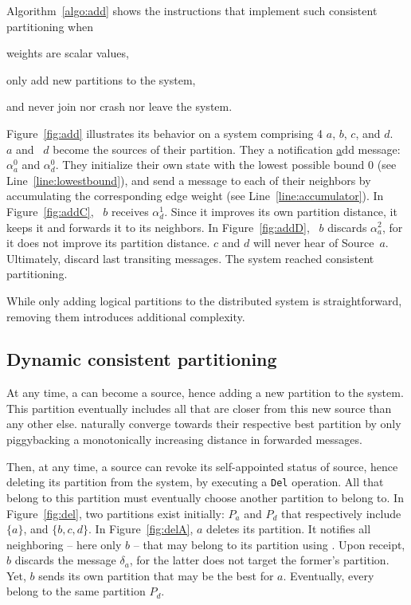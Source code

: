  

Algorithm~\ref{algo:add} shows the instructions that implement such
consistent partitioning when
\begin{inparaenum}[(i)]
\item weights are scalar values,
\item \processes only add new partitions to the system,
\item and \processes never join nor crash nor leave the system.
\end{inparaenum}
Figure~\ref{fig:add} illustrates its behavior on a system comprising 4
\processes $a$, $b$, $c$, and $d$. \Process~$a$ and \Process~$d$ become
the sources of their partition. They \NAMEB a notification
\underline{a}dd message: $\alpha_a^0$ and $\alpha_d^0$. They
initialize their own state with the lowest possible bound $0$ (see
Line~\ref{line:lowestbound}), and send a message to each of their
neighbors by accumulating the corresponding edge weight (see
Line~\ref{line:accumulator}). In Figure~\ref{fig:addC}, \Process~$b$
receives $\alpha_{d}^{1}$. Since it improves its own partition
distance, it keeps it and forwards it to its neighbors. In
Figure~\ref{fig:addD}, \Process~$b$ discards $\alpha_{a}^{2}$, for it
does not improve its partition distance. \Processes $c$ and $d$ will
never hear of Source~$a$. Ultimately, \processes discard last
transiting messages. The system reached consistent partitioning.

While only adding logical partitions to the distributed system is
straightforward, removing them introduces additional complexity.

\subsection{Dynamic consistent partitioning}

At any time, a \process can become a source, hence adding a new
partition to the system. This partition eventually includes all
\processes that are closer from this new source than any other
else. \Processes naturally converge towards their respective best
partition by only piggybacking a monotonically increasing distance in
forwarded messages.

Then, at any time, a source can revoke its self-appointed status of
source, hence deleting its partition from the system, by executing a
\texttt{Del} operation. All \processes that belong to this partition
must eventually choose another partition to belong to. In
Figure~\ref{fig:del}, two partitions exist initially: $P_a$ and $P_d$
that respectively include $\{a\}$, and $\{b, c, d\}$. In
Figure~\ref{fig:delA}, \Process $a$ deletes its partition. It notifies
all neighboring \processes -- here only \Process $b$ -- that may belong
to its partition using \NAMEB. Upon receipt, \Process $b$ discards the
message $\delta_a$, for the latter does not target the former's
partition. Yet, \Process $b$ sends its own partition that may be the
best for \Process $a$. Eventually, every \processes belong to the same
partition $P_d$.

